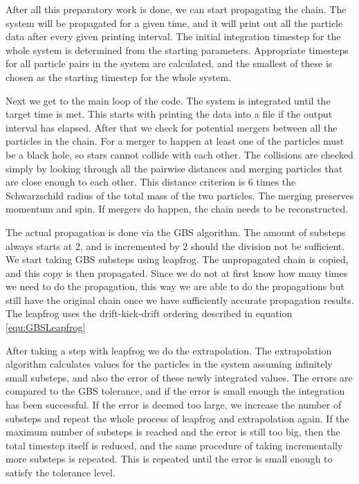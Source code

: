 \documentclass[english, oneside]{HYgradu}
\begin{document}
After all this preparatory work is done, we can start propagating the chain. The system will be propagated for a given time, and it will print out all the particle data after every given printing interval. The initial integration timestep for the whole system is determined from the starting parameters. Appropriate timesteps for all particle pairs in the system are calculated, and the smallest of these is chosen as the starting timestep for the whole system.

Next we get to the main loop of the code. The system is integrated until the target time is met. This starts with printing the data into a file if the output interval has elapsed. After that we check for potential mergers between all the particles in the chain. For a merger to happen at least one of the particles must be a black hole, so stars cannot collide with each other. The collisions are checked simply by looking through all the pairwise distances and merging particles that are close enough to each other. This distance criterion is 6 times the Schwarzschild radius of the total mass of the two particles. The merging preserves momentum and spin. If mergers do happen, the chain needs to be reconstructed.

The actual propagation is done via the GBS algorithm. The amount of substeps always starts at 2, and is incremented by 2 should the division not be sufficient. We start taking GBS substeps using leapfrog.
The unpropagated chain is copied, and this copy is then propagated. Since we do not at first know how many times we need to do the propagation, this way we are able to do the propagations but still have the original chain once we have sufficiently accurate propagation results. The leapfrog uses the drift-kick-drift ordering described in equation \ref{equ:GBSLeapfrog}

After taking a step with leapfrog we do the extrapolation. The extrapolation algorithm calculates values for the particles in the system assuming infinitely small substeps, and also the error of these newly integrated values. The errors are compared to the GBS tolerance, and if the error is small enough the integration has been successful. If the error is deemed too large, we increase the number of substeps and repeat the whole process of leapfrog and extrapolation again. If the maximum number of substeps is reached and the error is still too big, then the total timestep itself is reduced, and the same procedure of taking incrementally more substeps is repeated. This is repeated until the error is small enough to satisfy the tolerance level.
\end{document}
